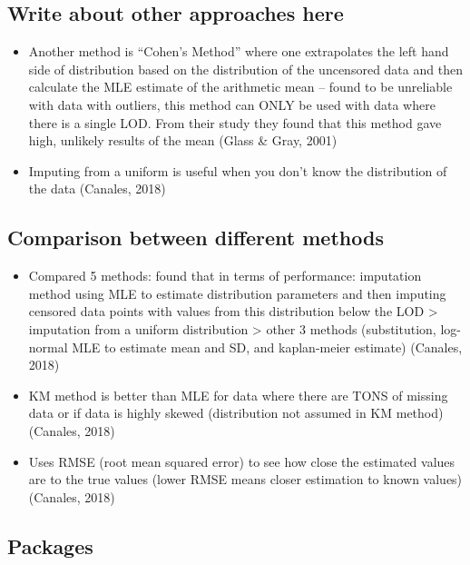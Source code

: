 \documentclass[12pt, twoside]{amherstthesis}
\begin{document}
\hypertarget{write-about-other-approaches-here}{%
\subsection{Write about other approaches here}\label{write-about-other-approaches-here}}
\begin{itemize}
\item
  Another method is ``Cohen's Method'' where one extrapolates the left hand side of distribution based on the distribution of the uncensored data and then calculate the MLE estimate of the arithmetic mean -- found to be unreliable with data with outliers, this method can ONLY be used with data where there is a single LOD. From their study they found that this method gave high, unlikely results of the mean (Glass \& Gray, 2001)
\item
  Imputing from a uniform is useful when you don't know the distribution of the data (Canales, 2018)
\end{itemize}
\hypertarget{comparison-between-different-methods}{%
\subsection{Comparison between different methods}\label{comparison-between-different-methods}}
\begin{itemize}
\item
  Compared 5 methods: found that in terms of performance: imputation method using MLE to estimate distribution parameters and then imputing censored data points with values from this distribution below the LOD \textgreater{} imputation from a uniform distribution \textgreater{} other 3 methods (substitution, log-normal MLE to estimate mean and SD, and kaplan-meier estimate) (Canales, 2018)
\item
  KM method is better than MLE for data where there are TONS of missing data or if data is highly skewed (distribution not assumed in KM method) (Canales, 2018)
\item
  Uses RMSE (root mean squared error) to see how close the estimated values are to the true values (lower RMSE means closer estimation to known values) (Canales, 2018)
\end{itemize}
\hypertarget{packages}{%
\subsection{Packages}\label{packages}}
\end{document}
